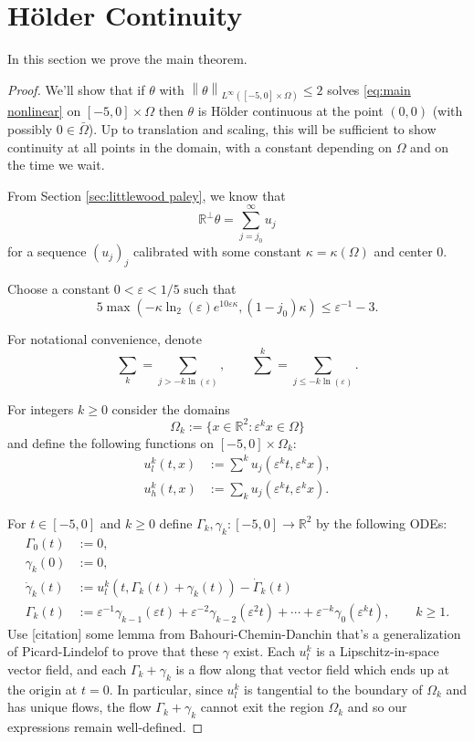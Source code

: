 \documentclass[11pt]{amsart}
\theoremstyle{remark}
\theoremstyle{definition}
\newcommand{\R}{\mathbb{R}}
\newcommand{\eps}{\varepsilon}
\newcommand{\norm}[1]{\left\lVert#1\right\rVert}
\newcommand{\paren}[1]{\left( #1 \right)}
\newcommand{\n}{^{-1}}
\newcommand{\ulow}{u_l}
\newcommand{\uhigh}{u_h}
\newcommand{\ulowth}[1]{\ulow^{#1}}
\newcommand{\uhighth}[1]{\uhigh^{#1}}
\begin{document}

\section{H\"{o}lder Continuity} \label{sec:holder}

In this section we prove the main theorem.  

\begin{proof}
We'll show that if $\theta$ with $\norm{\theta}_{L^\infty([-5,0] \times \Omega)} \leq 2$ solves \eqref{eq:main nonlinear} on $[-5,0]\times \Omega$ then $\theta$ is H\"{o}lder continuous at the point $(0,0)$ (with possibly $0 \in \bar{\Omega}$).  Up to translation and scaling, this will be sufficient to show continuity at all points in the domain, with a constant depending on $\Omega$ and on the time we wait.  

From Section \ref{sec:littlewood paley}, we know that 
\[ \R^\perp \theta = \sum_{j=j_0}^\infty u_j \]
for a sequence $(u_j)_j$ calibrated with some constant $\kappa = \kappa(\Omega)$ and center 0.  

Choose a constant $0 < \eps < 1/5$ such that
\begin{equation}\label{eps is small enough for Cgamma} 
5 \max\paren{ - \kappa \ln_2(\eps) e^{10\eps\kappa}, (1-j_0) \kappa} \leq \eps\n - 3. 
\end{equation}

For notational convenience, denote
\[ \sum_k = \sum_{j > - k \ln(\eps)}, \qquad \sum^k = \sum_{j \leq -k \ln(\eps)}. \]

For integers $k \geq 0$ consider the domains
\[ \Omega_k := \{x \in \R^2: \eps^k x \in \Omega\} \]
and define the following functions on $[-5,0]\times \Omega_k$:
\begin{align*} 
\ulowth{k}(t,x) &:= \sum^k u_j(\eps^k t, \eps^k x), \\
\uhighth{k}(t,x) &:= \sum_k u_j(\eps^k t, \eps^k x).  
\end{align*}

For $t \in [-5,0]$ and $k \geq 0$ define $\Gamma_k, \gamma_k: [-5,0] \to \R^2$ by the following ODEs:
\begin{align*}
\Gamma_0(t) &:= 0, \\
\gamma_k(0) &:= 0, \\
\dot{\gamma}_k(t) &:= \ulowth{k}(t, \Gamma_k(t) + \gamma_k(t)) - \dot{\Gamma}_k(t) \\
\Gamma_k(t) &:= \eps\n \gamma_{k-1}(\eps t) + \eps^{-2} \gamma_{k-2}(\eps^2 t) + \cdots + \eps^{-k} \gamma_0(\eps^k t), \qquad k \geq 1.
\end{align*}
Use [citation] some lemma from Bahouri-Chemin-Danchin that's a generalization of Picard-Lindelof to prove that these $\gamma$ exist.  Each $\ulowth{k}$ is a Lipschitz-in-space vector field, and each $\Gamma_k + \gamma_k$ is a flow along that vector field which ends up at the origin at $t=0$.  In particular, since  $\ulowth{k}$ is tangential to the boundary of $\Omega_k$ and has unique flows, the flow $\Gamma_k + \gamma_k$ cannot exit the region $\Omega_k$ and so our expressions remain well-defined.  


\end{proof}
\end{document}
